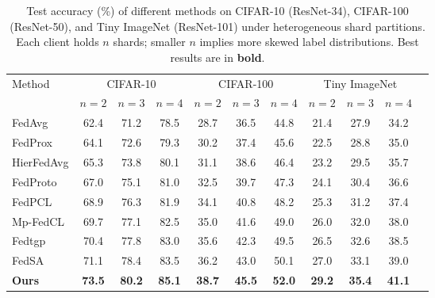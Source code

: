 \documentclass[twoside]{article}
\begin{document}
        
        \begin{table}[t]
        \centering
        \caption{Test accuracy (\%) of different methods on CIFAR-10 (ResNet-34), CIFAR-100 (ResNet-50), 
        and Tiny ImageNet (ResNet-101) under heterogeneous shard partitions. 
        Each client holds $n$ shards; smaller $n$ implies more skewed label distributions. 
        Best results are in \textbf{bold}.}
        \label{tab:shards_results}
        \begin{tabular}{lcccccccccc}
        \toprule
        \multirow{2}{*}{Method} & \multicolumn{3}{c}{CIFAR-10} & \multicolumn{3}{c}{CIFAR-100} & \multicolumn{3}{c}{Tiny ImageNet} \\
         & $n{=}2$ & $n{=}3$ & $n{=}4$ & $n{=}2$ & $n{=}3$ & $n{=}4$ & $n{=}2$ & $n{=}3$ & $n{=}4$ \\
        \midrule
        FedAvg     & 62.4 & 71.2 & 78.5 & 28.7 & 36.5 & 44.8 & 21.4 & 27.9 & 34.2 \\
        FedProx    & 64.1 & 72.6 & 79.3 & 30.2 & 37.4 & 45.6 & 22.5 & 28.8 & 35.0 \\
        HierFedAvg & 65.3 & 73.8 & 80.1 & 31.1 & 38.6 & 46.4 & 23.2 & 29.5 & 35.7 \\
        FedProto   & 67.0 & 75.1 & 81.0 & 32.5 & 39.7 & 47.3 & 24.1 & 30.4 & 36.6 \\
        FedPCL     & 68.9 & 76.3 & 81.9 & 34.1 & 40.8 & 48.2 & 25.3 & 31.2 & 37.4 \\
        Mp-FedCL   & 69.7 & 77.1 & 82.5 & 35.0 & 41.6 & 49.0 & 26.0 & 32.0 & 38.0 \\
        Fedtgp     & 70.4 & 77.8 & 83.0 & 35.6 & 42.3 & 49.5 & 26.5 & 32.6 & 38.5 \\
        FedSA      & 71.1 & 78.4 & 83.5 & 36.2 & 43.0 & 50.1 & 27.0 & 33.1 & 39.0 \\
        \midrule
        \textbf{Ours} & \textbf{73.5} & \textbf{80.2} & \textbf{85.1} & \textbf{38.7} & \textbf{45.5} & \textbf{52.0} & \textbf{29.2} & \textbf{35.4} & \textbf{41.1} \\
        \bottomrule
        \end{tabular}
        \end{table}
\end{document}

